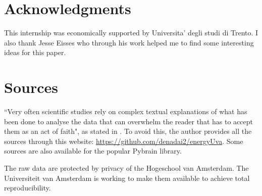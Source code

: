 \documentclass{sig-alternate-sigmod07}
\begin{document}


\section{Acknowledgments}
This internship was economically supported by Universita' degli studi di Trento. I also thank Jesse Eisses who through his work helped me to find some interesting ideas for this paper.

%

%
%
\appendix
\section{Sources}
``Very often scientific studies rely on complex textual explanations of what has been done to analyse the data that can overwhelm the reader that has to accept them as an act of faith", as stated in \cite{reproducibility}. To avoid this, the author provides all the sources through this website: \url{https://github.com/denadai2/energyUva}. Some sources are also available for the popular Pybrain \cite{schaul2010} library.

The raw data are protected by privacy of the Hogeschool van Amsterdam. The Universiteit van Amsterdam is working to make them available to achieve total reproducibility.


\balancecolumns %
\end{document}
